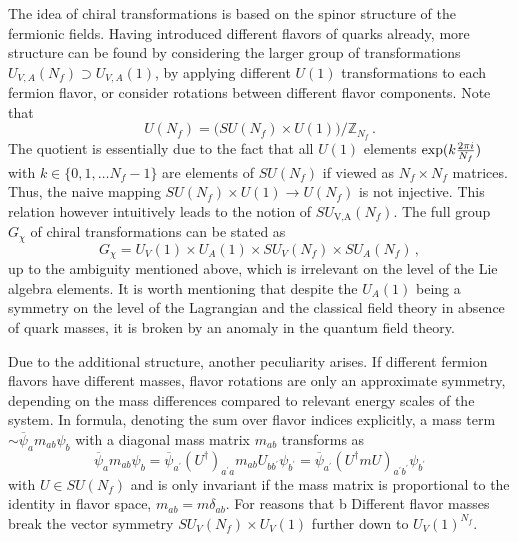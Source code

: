 The idea of chiral transformations is based on the spinor structure of the fermionic fields. Having introduced different flavors of quarks already, more structure can be found by considering the larger group of transformations ${U_{V,A}(N_f)\supset U_{V,A}(1)}$, by applying different $U(1)$ transformations to each fermion flavor, or consider rotations between different flavor components. Note that
\begin{equation}
    U(N_f)=\big(SU(N_f)\times U(1)\big)/\mathbb{Z}_{N_f}\,.
\end{equation}
The quotient is essentially due to the fact that all ${U(1)}$ elements ${\exp(k\frac{2\pi{i}}{N_f})}$ with ${k\in\{0,1,\dots N_f-1\}}$ are elements of ${SU(N_f)}$ if viewed as ${N_f\times N_f}$ matrices. Thus, the naive mapping ${SU(N_f)\times U(1)\to U(N_f)}$ is not injective. This relation however intuitively leads to the notion of ${SU_\text{V,A}(N_f)}$. The full group ${G_\chi}$ of chiral transformations can be stated as
\begin{equation}
    G_\chi=U_V(1)\times U_A(1)\times SU_V(N_f)\times SU_A(N_f)\,,
\end{equation}
up to the ambiguity mentioned above, which is irrelevant on the level of the Lie algebra elements. It is worth mentioning that despite the $U_A(1)$ being a symmetry on the level of the Lagrangian and the classical field theory in absence of quark masses, it is broken by an anomaly in the quantum field theory.

Due to the additional structure, another peculiarity arises. If different fermion flavors have different masses, flavor rotations are only an approximate symmetry, depending on the mass differences compared to relevant energy scales of the system. In formula, denoting the sum over flavor indices explicitly, a mass term ${\sim\overline{\psi}_am_{ab}\psi_b}$ with a diagonal mass matrix $m_{ab}$ transforms as
\begin{equation}
    \overline{\psi}_am_{ab}\psi_b=\overline{\psi}_{a^\prime}(U^\dagger)_{a^\prime a}m_{ab}U_{bb^\prime}\psi_{b^\prime}=\overline{\psi}_{a^\prime}(U^\dagger mU)_{a^\prime b^\prime}\psi_{b^\prime}
\end{equation}
with ${U\in SU(N_f)}$ and is only invariant if the mass matrix is proportional to the identity in flavor space, ${m_{ab}=m\delta_{ab}}$. For reasons that b Different flavor masses break the vector symmetry ${SU_V(N_f)\times U_V(1)}$ further down to ${U_V(1)^{N_f}}$.


